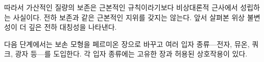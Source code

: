 따라서 가산적인 질량의 보존은 근본적인 규칙이라기보다 비상대론적 근사에서 성립하는 사실이다. 전하 보존과 같은 근본적인 지위를 갖지는 않는다. 앞서 살펴본 위상 불변성이 더 깊은 전하 대칭성을 나타낸다.

다음 단계에서는 보손 모형을 페르미온 장으로 바꾸고 여러 입자 종류---전자, 뮤온, 쿼크, 광자 등---를 도입한다. 각 입자 종류에는 고유한 장과 허용된 상호작용이 있다.

\begin{classroomqa}
\end{classroomqa}